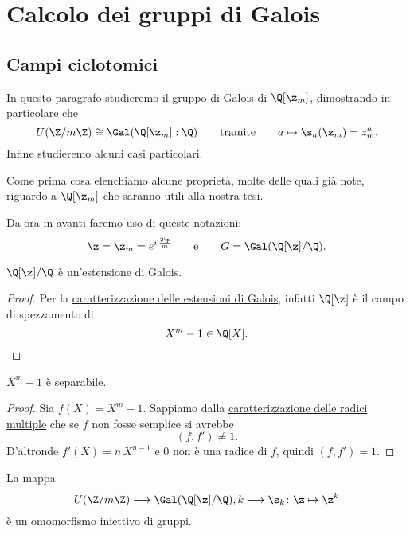 \chapter{Calcolo dei gruppi di Galois}
%
%
\section{Campi ciclotomici}

In questo paragrafo studieremo il gruppo di Galois di \(\Q[\z_m]\), dimostrando in particolare che
\[
	U(\Z/m\Z) \cong \Gal(\Q[\z_m]:\Q) \qquad\text{tramite}\qquad a\mapsto \s_a(\z_m)=z_m^a.
\]
Infine studieremo alcuni casi particolari.

Come prima cosa elenchiamo alcune proprietà, molte delle quali già note, riguardo a \(\Q[\z_m]\) che saranno utili alla nostra tesi.

Da ora in avanti faremo uso di queste notazioni:
\[
	\z = \z_m = e^{i\,\frac{2\p}{m}} \qquad\text{e}\qquad G = \Gal(\Q[\z]/\Q).
\]

\begin{pr}\label{campiCiclo1}
	\(\Q[\z]/\Q\) è un'estensione di Galois.
\end{pr}

\begin{proof}
	Per la \hyperref[th:caratterizzazioneEstensioniGalois]{caratterizzazione delle estensioni di Galois}, infatti \(\Q[\z]\) è il campo di spezzamento di
	\[
		X^m-1 \in \Q[X].\qedhere
	\]
\end{proof}

\begin{pr}\label{campiCiclo2}
	\(X^m-1\) è separabile.
\end{pr}

\begin{proof}
	Sia \(f(X)=X^m-1\). Sappiamo dalla \hyperref[pr:caratterizzazioneRadiciMultiple]{caratterizzazione delle radici multiple} che se \(f\) non fosse semplice si avrebbe
	\[
		(f,f')\neq 1.
	\]
	D'altronde \(f'(X)=n\,X^{n-1}\) e \(0\) non è una radice di \(f\), quindi \((f,f')=1\).
\end{proof}

\begin{pr}\label{campiCiclo3}
	La mappa
	\[
		U(\Z/m\Z) \longrightarrow \Gal(\Q[\z]/\Q), k \longmapsto \s_k\colon \z \mapsto \z^k
	\]
	è un omomorfismo iniettivo di gruppi.
\end{pr}


